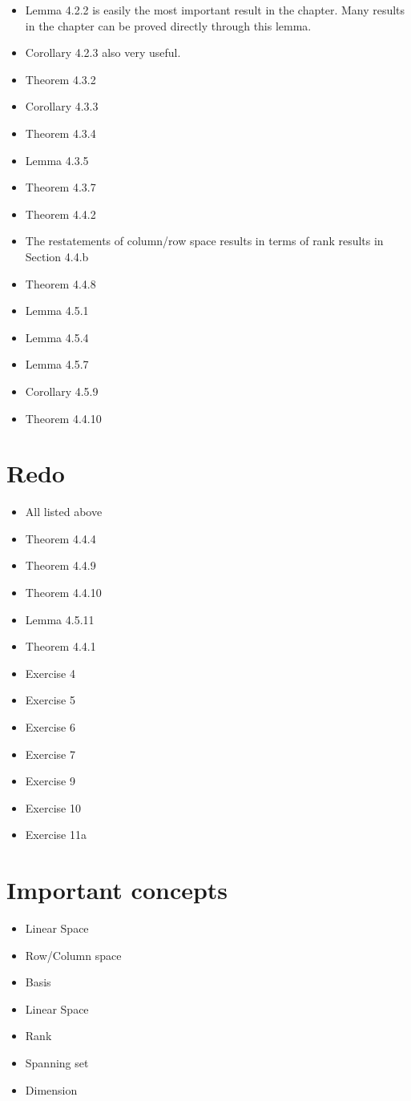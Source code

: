\documentclass[a4paper, oneside]{book}
\begin{document}
\begin{itemize}
\item Lemma 4.2.2 is easily the most important result in the chapter. Many results in the chapter can be proved directly through this lemma.
\item Corollary 4.2.3 also very useful.
\item Theorem 4.3.2
\item Corollary 4.3.3
\item Theorem 4.3.4
\item Lemma 4.3.5
\item Theorem 4.3.7
\item Theorem 4.4.2
\item The restatements of column/row space results in terms of rank results in Section 4.4.b
\item Theorem 4.4.8
\item Lemma 4.5.1
\item Lemma 4.5.4
\item Lemma 4.5.7
\item Corollary 4.5.9
\item Theorem 4.4.10
\end{itemize}


\section{Redo}
\begin{itemize}
\item All listed above
\item Theorem 4.4.4
\item Theorem 4.4.9
\item Theorem 4.4.10
\item Lemma 4.5.11
\item Theorem 4.4.1
\item Exercise 4
\item Exercise 5
\item Exercise 6
\item Exercise 7
\item Exercise 9
\item Exercise 10
\item Exercise 11a
\end{itemize}

\section{Important concepts}
\begin{itemize}
\item Linear Space
\item Row/Column space
\item Basis
\item Linear Space
\item Rank
\item Spanning set
\item Dimension
\end{itemize}
\end{document}
